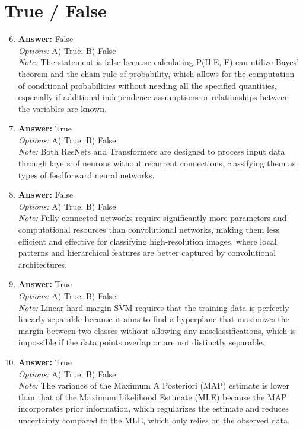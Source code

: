 \documentclass[12pt]{article}
\begin{document}
\section*{True / False}
\begin{enumerate}[label=\arabic*.]
\setcounter{enumi}{5}
\item \textbf{Answer:} False
\\ \textit{Options:} A) True; B) False
\\ \textit{Note:} The statement is false because calculating P(H|E, F) can utilize Bayes' theorem and the chain rule of probability, which allows for the computation of conditional probabilities without needing all the specified quantities, especially if additional independence assumptions or relationships between the variables are known.
\item \textbf{Answer:} True
\\ \textit{Options:} A) True; B) False
\\ \textit{Note:} Both ResNets and Transformers are designed to process input data through layers of neurons without recurrent connections, classifying them as types of feedforward neural networks.
\item \textbf{Answer:} False
\\ \textit{Options:} A) True; B) False
\\ \textit{Note:} Fully connected networks require significantly more parameters and computational resources than convolutional networks, making them less efficient and effective for classifying high-resolution images, where local patterns and hierarchical features are better captured by convolutional architectures.
\item \textbf{Answer:} True
\\ \textit{Options:} A) True; B) False
\\ \textit{Note:} Linear hard-margin SVM requires that the training data is perfectly linearly separable because it aims to find a hyperplane that maximizes the margin between two classes without allowing any misclassifications, which is impossible if the data points overlap or are not distinctly separable.
\item \textbf{Answer:} True
\\ \textit{Options:} A) True; B) False
\\ \textit{Note:} The variance of the Maximum A Posteriori (MAP) estimate is lower than that of the Maximum Likelihood Estimate (MLE) because the MAP incorporates prior information, which regularizes the estimate and reduces uncertainty compared to the MLE, which only relies on the observed data.
\end{enumerate}
\end{document}
